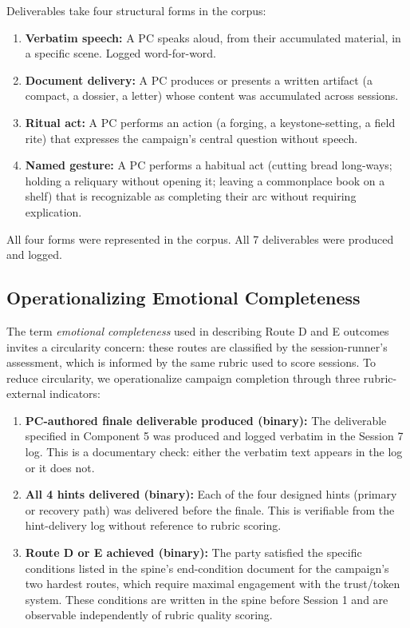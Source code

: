 Deliverables take four structural forms in the corpus:
\begin{enumerate}
  \item \textbf{Verbatim speech:} A PC speaks aloud, from their accumulated
    material, in a specific scene. Logged word-for-word.
  \item \textbf{Document delivery:} A PC produces or presents a written artifact
    (a compact, a dossier, a letter) whose content was accumulated across sessions.
  \item \textbf{Ritual act:} A PC performs an action (a forging, a keystone-setting,
    a field rite) that expresses the campaign's central question without speech.
  \item \textbf{Named gesture:} A PC performs a habitual act (cutting bread
    long-ways; holding a reliquary without opening it; leaving a commonplace
    book on a shelf) that is recognizable as completing their arc without requiring
    explication.
\end{enumerate}

All four forms were represented in the corpus. All 7 deliverables were produced
and logged.

\subsection{Operationalizing Emotional Completeness}
\label{subsec:operationalizing-completion}

The term \textit{emotional completeness} used in describing Route D and E outcomes
invites a circularity concern: these routes are classified by the session-runner's
assessment, which is informed by the same rubric used to score sessions. To reduce
circularity, we operationalize campaign completion through three rubric-external
indicators:

\begin{enumerate}
  \item \textbf{PC-authored finale deliverable produced (binary):} The deliverable
    specified in Component 5 was produced and logged verbatim in the Session 7
    log. This is a documentary check: either the verbatim text appears in the log
    or it does not.
  \item \textbf{All 4 hints delivered (binary):} Each of the four designed hints
    (primary or recovery path) was delivered before the finale. This is verifiable
    from the hint-delivery log without reference to rubric scoring.
  \item \textbf{Route D or E achieved (binary):} The party satisfied the specific
    conditions listed in the spine's end-condition document for the campaign's two
    hardest routes, which require maximal engagement with the trust/token system.
    These conditions are written in the spine before Session 1 and are observable
    independently of rubric quality scoring.
\end{enumerate}

